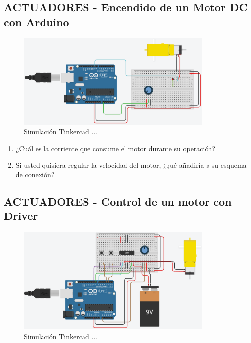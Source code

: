 \documentclass{article}
\begin{document}


\subsection{ACTUADORES - Encendido de un Motor DC con Arduino}

\begin{figure}[H]
    \centering
    \includegraphics[width=0.85\textwidth]{./img/ckpt_encendido_motor.png}
    \caption{Simulación Tinkercad ...}
    \label{fig:encendido_motor}
\end{figure}


\begin{enumerate}
    \item ¿Cuál es la corriente que consume el motor durante su operación?
    \item Si usted quisiera regular la velocidad del motor, ¿qué añadiría a su esquema de conexión?
\end{enumerate}

\subsection{ACTUADORES - Control de un motor con Driver}


\begin{figure}[H]
    \centering
    \includegraphics[width=0.85\textwidth]{./img/ckpt_motor_driver.png}
    \caption{Simulación Tinkercad ...}
    \label{fig:motor_driver}
\end{figure}
\end{document}
